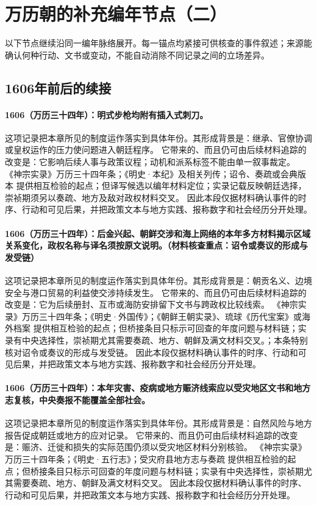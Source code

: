 \section{万历朝的补充编年节点（二）}
以下节点继续沿同一编年脉络展开。每一锚点均紧接可供核查的事件叙述；来源能确认何种行动、文书或变动，不能自动消除不同记录之间的立场差异。

\subsection{1606年前后的续接}

\paragraph{1606（万历三十四年）：明式步枪均附有插入式刺刀。} 这项记录把本章所见的制度运作落实到具体年份。其形成背景是：继承、官僚协调或皇权运作的压力使问题进入朝廷程序。 它带来的、而且仍可由后续材料追踪的改变是：它影响后续人事与政策议程；动机和派系标签不能由单一叙事裁定。 《神宗实录》万历三十四年条；《明史·本纪》及相关列传；诏令、奏疏或会典版本 提供相互检验的起点；但译写候选以编年材料定位；实录记载反映朝廷选择，崇祯期须另以奏疏、地方及敌对政权材料交叉。 因此本段仅据材料确认事件的时序、行动和可见后果，并把政策文本与地方实践、报称数字和社会经历分开处理。

\paragraph{1606（万历三十四年）：后金兴起、朝鲜交涉和海上网络的本年多方材料揭示区域关系变化，政权名称与译名须按原文说明。（材料核查重点：诏令或奏议的形成与发受链）} 这项记录把本章所见的制度运作落实到具体年份。其形成背景是：朝贡名义、边境安全与港口贸易的利益使交涉持续发生。 它带来的、而且仍可由后续材料追踪的改变是：它为后续册封、互市或海防安排留下文书与跨政权比较线索。 《神宗实录》万历三十四年条；《明史·外国传》；《朝鲜王朝实录》、琉球《历代宝案》或海外档案 提供相互检验的起点；但桥接条目只标示可回查的年度问题与材料链；实录有中央选择性，崇祯期尤其需要奏疏、地方、朝鲜及满文材料交叉。；本条特别核对诏令或奏议的形成与发受链。 因此本段仅据材料确认事件的时序、行动和可见后果，并把政策文本与地方实践、报称数字和社会经历分开处理。

\paragraph{1606（万历三十四年）：本年灾害、疫病或地方赈济线索应以受灾地区文书和地方志复核，中央奏报不能覆盖全部社会。} 这项记录把本章所见的制度运作落实到具体年份。其形成背景是：自然风险与地方报告促成朝廷或地方的应对记录。 它带来的、而且仍可由后续材料追踪的改变是：赈济、迁徙和损失的实际范围仍须以受灾地区材料分别核验。 《神宗实录》万历三十四年条；《明史·五行志》；受灾府县地方志与奏疏 提供相互检验的起点；但桥接条目只标示可回查的年度问题与材料链；实录有中央选择性，崇祯期尤其需要奏疏、地方、朝鲜及满文材料交叉。 因此本段仅据材料确认事件的时序、行动和可见后果，并把政策文本与地方实践、报称数字和社会经历分开处理。

